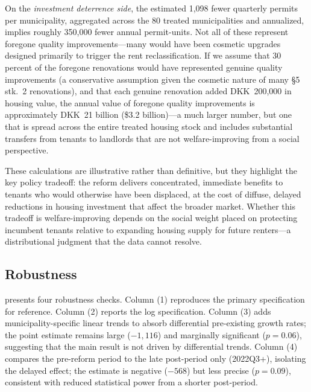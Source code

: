 \documentclass[12pt]{article}
\begin{document}
On the \emph{investment deterrence side}, the estimated 1,098 fewer quarterly permits per municipality, aggregated across the 80 treated municipalities and annualized, implies roughly 350,000 fewer annual permit-units. Not all of these represent foregone quality improvements---many would have been cosmetic upgrades designed primarily to trigger the rent reclassification. If we assume that 30 percent of the foregone renovations would have represented genuine quality improvements (a conservative assumption given the cosmetic nature of many \S5 stk.\ 2 renovations), and that each genuine renovation added DKK~200,000 in housing value, the annual value of foregone quality improvements is approximately DKK~21 billion (\$3.2 billion)---a much larger number, but one that is spread across the entire treated housing stock and includes substantial transfers from tenants to landlords that are not welfare-improving from a social perspective.

These calculations are illustrative rather than definitive, but they highlight the key policy tradeoff: the reform delivers concentrated, immediate benefits to tenants who would otherwise have been displaced, at the cost of diffuse, delayed reductions in housing investment that affect the broader market. Whether this tradeoff is welfare-improving depends on the social weight placed on protecting incumbent tenants relative to expanding housing supply for future renters---a distributional judgment that the data cannot resolve.

\subsection{Robustness}



 presents four robustness checks. Column (1) reproduces the primary specification for reference. Column (2) reports the log specification. Column (3) adds municipality-specific linear trends to absorb differential pre-existing growth rates; the point estimate remains large ($-1,116$) and marginally significant ($p = 0.06$), suggesting that the main result is not driven by differential trends. Column (4) compares the pre-reform period to the late post-period only (2022Q3+), isolating the delayed effect; the estimate is negative ($-568$) but less precise ($p = 0.09$), consistent with reduced statistical power from a shorter post-period.


\end{document}
